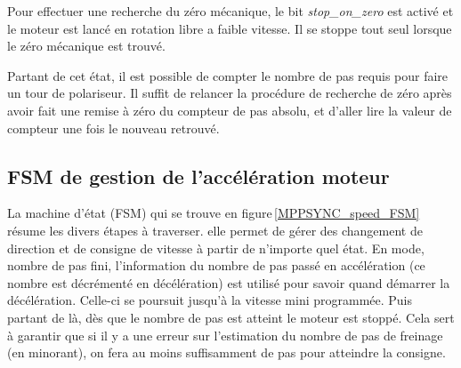 \documentclass[11pt,a4paper,oneside,onecolumn]{article}
\begin{document}
Pour effectuer une recherche du zéro mécanique, le bit \emph{stop\_on\_zero} est activé et le moteur est lancé en rotation libre a faible vitesse. 
Il se stoppe tout seul lorsque le zéro mécanique est trouvé.

Partant de cet état, il est possible de compter le nombre de pas requis pour faire un tour de polariseur.
Il suffit de relancer la procédure de recherche de zéro après avoir fait une remise à zéro du compteur de pas absolu, et d'aller lire la valeur de compteur une fois le nouveau retrouvé.


\subsection{FSM de gestion de l'accélération moteur}
\label{speedFSM_sec}
La machine d'état (FSM) qui se trouve en figure\,\ref{MPPSYNC_speed_FSM} résume les divers étapes à traverser. elle permet de gérer des changement de direction et de consigne de vitesse à partir de n'importe quel état. En mode, nombre de pas fini, l'information du nombre de pas passé en accélération (ce nombre est décrémenté en décélération) est utilisé pour savoir quand démarrer la décélération. Celle-ci se poursuit jusqu'à la vitesse mini programmée. Puis partant de là, dès que le nombre de pas est atteint le moteur est stoppé. Cela sert à garantir que si il y a une erreur sur l'estimation du nombre de pas de freinage (en minorant), on fera au moins suffisamment de pas pour atteindre la consigne.
\end{document}
